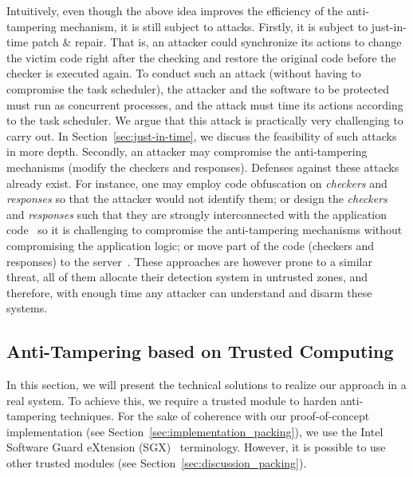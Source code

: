 Intuitively, even though the above idea improves the efficiency of the 
anti-tampering mechanism, it is still subject to attacks. Firstly, it is 
subject to just-in-time patch \& repair. That is, an attacker could synchronize 
its actions to change the victim code right after the checking and restore the 
original code before the checker is executed again.
To conduct such an attack (without having to compromise the task scheduler), 
the attacker and the software to be protected must run as concurrent processes, 
and the attack must time its actions according to the task scheduler.
We argue that this attack is practically very challenging to carry out.
In Section~\ref{sec:just-in-time}, we discuss the feasibility of such attacks 
in more depth.
Secondly, an attacker may compromise the anti-tampering mechanisms (\ie modify 
the checkers and responses). 
Defenses against these attacks already exist.
For instance, one may employ code obfuscation on \emph{checkers} and 
\emph{responses} so that the attacker would not identify them; or design the 
\emph{checkers} and \emph{responses} such that they are strongly interconnected 
with the application code~\cite{biondi2006silver} so it is challenging to 
compromise the anti-tampering mechanisms without compromising the application 
logic; or move part of the code (\eg checkers and responses) to the 
server~\cite{viticchie2016reactive}.
These approaches are however prone to a similar threat, \ie all of them 
allocate their detection system in untrusted zones, 
and therefore, with enough time any attacker can understand and disarm these 
systems.

\subsection{Anti-Tampering based on Trusted Computing}

In this section, we will present the technical solutions to realize our 
approach in a real system.
To achieve this, we require a trusted module to harden anti-tampering 
techniques.
For the sake of coherence with our proof-of-concept implementation (see 
Section~\ref{sec:implementation_packing}), we use the Intel Software Guard 
eXtension 
(SGX)~\cite{rozas2013intel} terminology.
However, it is possible to use other trusted modules (see 
Section~\ref{sec:discussion_packing}).

